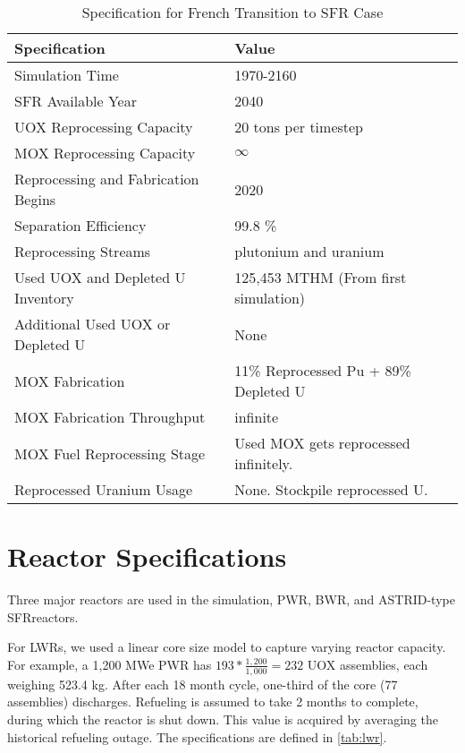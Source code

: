 \begin{table}[h]
	\centering
	\begin{tabularx}{\textwidth}{bb}
		\hline
		\textbf{Specification }& \textbf{Value} \\
		\hline
		Simulation Time & 1970-2160 \\
		\gls{SFR} Available Year & 2040 \\
		\gls{UOX} Reprocessing Capacity & 20 tons per timestep \\
		\gls{MOX} Reprocessing Capacity & $\infty$ \\
		Reprocessing and Fabrication Begins & 2020 \\
		Separation Efficiency & 99.8 \% \\
		Reprocessing Streams & plutonium and uranium \\
		\small{Used \gls{UOX} and Depleted U Inventory} & 125,453 MTHM {\small (From first simulation)} \\
		\small{Additional Used \gls{UOX} or Depleted U} & None  \\
		\gls{MOX} Fabrication &  \small{11\% Reprocessed Pu + 89\% Depleted U}  \\
		\gls{MOX} Fabrication Throughput & infinite \\
		\gls{MOX} Fuel Reprocessing Stage &  Used \gls{MOX} gets reprocessed infinitely. \\
		Reprocessed Uranium Usage &  None. Stockpile reprocessed U. \\
		\hline
	\end{tabularx}
	\caption {Specification for French Transition to \gls{SFR} Case}
	\label{tab:sim_france}
\end{table}


\section{Reactor Specifications}
Three major reactors are used in the simulation, \gls{PWR}, \gls{BWR}, and ASTRID-type \gls{SFR}reactors.

For \glspl{LWR}, we used a linear core size model to capture
varying reactor capacity. For example, a 
1,200 MWe PWR has $193*\frac{1,200}{1,000} = 232$ \gls{UOX} assemblies, each
weighing 523.4 kg.
After each 18 month cycle, one-third of the 
core (77 assemblies) discharges. Refueling
is assumed to take 2 months to complete, during which the reactor
is shut down. This value is acquired by averaging the 
historical refueling outage. The specifications are defined in \cref{tab:lwr}.

